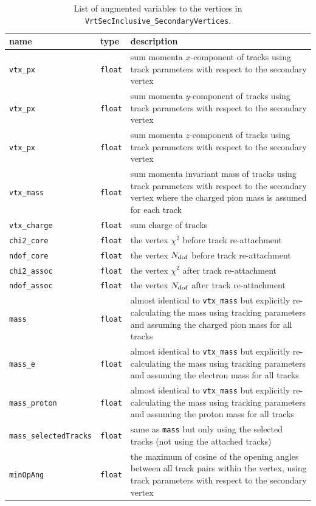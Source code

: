 \begin{table}[htbp]
\caption{List of augmented variables to the vertices in {\tt VrtSecInclusive\_SecondaryVertices}.}
\centering
\scriptsize
\begin{tabular}{llp{10cm}}
\hline
\hline
name & type & description\\
\hline
{\tt vtx\_px} & {\tt float} & sum momenta $x$-component of tracks using track parameters with respect to the secondary vertex\\
{\tt vtx\_px} & {\tt float} & sum momenta $y$-component of tracks using track parameters with respect to the secondary vertex\\
{\tt vtx\_px} & {\tt float} & sum momenta $z$-component of tracks using track parameters with respect to the secondary vertex\\
{\tt vtx\_mass} & {\tt float} & sum momenta invariant mass of tracks using track parameters with respect to the secondary vertex where the charged pion mass is assumed for each track\\
{\tt vtx\_charge} & {\tt float} & sum charge of tracks\\
{\tt chi2\_core} & {\tt float} & the vertex $\chi^{2}$ before track re-attachment\\
{\tt ndof\_core} & {\tt float} & the vertex $N_{\rm dof}$ before track re-attachment\\
{\tt chi2\_assoc} & {\tt float} & the vertex $\chi^{2}$ after track re-attachment\\
{\tt ndof\_assoc} & {\tt float} & the vertex $N_{\rm dof}$ after track re-attachment\\
{\tt mass} & {\tt float} & almost identical to {\tt vtx\_mass} but explicitly re-calculating the mass using tracking parameters and assuming the charged pion mass for all tracks\\
{\tt mass\_e} & {\tt float} & almost identical to {\tt vtx\_mass} but explicitly re-calculating the mass using tracking parameters and assuming the electron mass for all tracks\\
{\tt mass\_proton} & {\tt float} & almost identical to {\tt vtx\_mass} but explicitly re-calculating the mass using tracking parameters and assuming the proton mass for all tracks\\
{\tt mass\_selectedTracks} & {\tt float} & same as {\tt mass} but only using the selected tracks (not using the attached tracks)\\
{\tt minOpAng} & {\tt float} & the maximum of cosine of the opening angles between all track pairs within the vertex, using track parameters with respect to the secondary vertex\\

\end{tabular}
\end{table}
